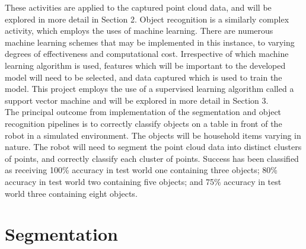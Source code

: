 \documentclass[a4paper]{article}
\begin{document}
These activities are applied to the captured point cloud data, and will be explored in more detail in Section 2. Object recognition is a similarly complex activity, which employs the uses of machine learning. There are numerous machine learning schemes that may be implemented in this instance, to varying degrees of effectiveness and computational cost. Irrespective of which machine learning algorithm is used, features which will be important to the developed model will need to be selected, and data captured which is used to train the model. This project employs the use of a supervised learning algorithm called a support vector machine and will be explored in more detail in Section 3.\\

The principal outcome from implementation of the segmentation and object recognition pipelines is to correctly classify objects on a table in front of the robot in a simulated environment. The objects will be household items varying in nature. The robot will need to segment the point cloud data into distinct clusters of points, and correctly classify each cluster of points. Success has been classified as receiving 100\% accuracy in test world one containing three objects; 80\% accuracy in test world two containing five objects; and 75\% accuracy in test world three containing eight objects.

\newpage


\section{Segmentation}
\end{document}
